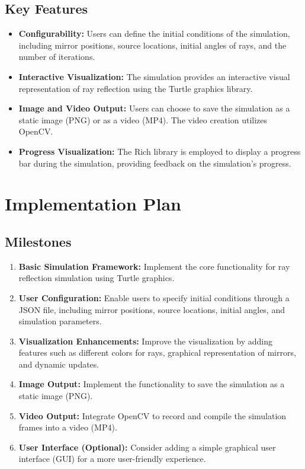 \documentclass{article}
\begin{document}
\subsection{Key Features}

\begin{itemize}
    \item \textbf{Configurability:} Users can define the initial conditions of the simulation, including mirror positions, source locations, initial angles of rays, and the number of iterations.
    \item \textbf{Interactive Visualization:} The simulation provides an interactive visual representation of ray reflection using the Turtle graphics library.
    \item \textbf{Image and Video Output:} Users can choose to save the simulation as a static image (PNG) or as a video (MP4). The video creation utilizes OpenCV.
    \item \textbf{Progress Visualization:} The Rich library is employed to display a progress bar during the simulation, providing feedback on the simulation's progress.
\end{itemize}

\section{Implementation Plan}

\subsection{Milestones}

\begin{enumerate}
    \item \textbf{Basic Simulation Framework:} Implement the core functionality for ray reflection simulation using Turtle graphics.
    \item \textbf{User Configuration:} Enable users to specify initial conditions through a JSON file, including mirror positions, source locations, initial angles, and simulation parameters.
    \item \textbf{Visualization Enhancements:} Improve the visualization by adding features such as different colors for rays, graphical representation of mirrors, and dynamic updates.
    \item \textbf{Image Output:} Implement the functionality to save the simulation as a static image (PNG).
    \item \textbf{Video Output:} Integrate OpenCV to record and compile the simulation frames into a video (MP4).
    \item \textbf{User Interface (Optional):} Consider adding a simple graphical user interface (GUI) for a more user-friendly experience.
\end{enumerate}
\end{document}
